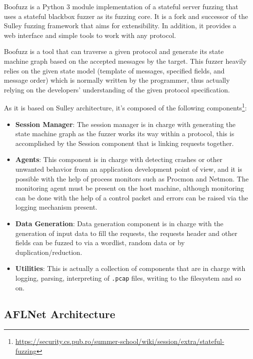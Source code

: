 \documentclass[10pt,a4paper,english,onecolumn]{IEEEtran}
\begin{document}
Boofuzz \cite{boofuzz_repo} is a Python 3 module implementation of a stateful server fuzzing that uses a stateful blackbox fuzzer as its fuzzing core. It is a fork and successor of the Sulley fuzzing framework that aims for extensibility. In addition, it provides a web interface and simple tools to work with any protocol.

Boofuzz is a tool that can traverse a given protocol and generate its state machine graph based on the accepted messages by the target. This fuzzer heavily relies on the given state model (template of messages, specified fields, and message order) which is normally written by the programmer, thus actually relying on the developers' understanding of the given protocol specification.

As it is based on Sulley architecture, it's composed of the following components\footnote{\href{https://security.cs.pub.ro/summer-school/wiki/session/extra/stateful-fuzzing}{https://security.cs.pub.ro/summer-school/wiki/session/extra/stateful-fuzzing}}:

\begin{itemize}
    \item \textbf{Session Manager}: The session manager is in charge with generating the state machine graph as the fuzzer works its way within a protocol, this is accomplished by the Session component that is linking requests together.
    \item \textbf{Agents}: This component is in charge with detecting crashes or other unwanted behavior from an application development point of view, and it is possible with the help of process monitors such as Procmon and Netmon. The monitoring agent must be present on the host machine, although monitoring can be done with the help of a control packet and errors can be raised via the logging mechanism present.
    \item \textbf{Data Generation}: Data generation component is in charge with the generation of input data to fill the requests, the requests header and other fields can be fuzzed to via a wordlist, random data or by duplication/reduction.
    \item \textbf{Utilities}: This is actually a collection of components that are in charge with logging, parsing, interpreting of \texttt{.pcap} files, writing to the filesystem and so on.
\end{itemize}

\subsection{AFLNet Architecture}
\end{document}
